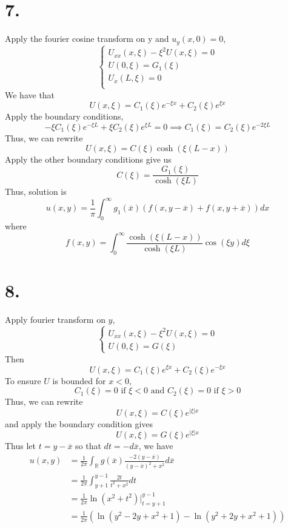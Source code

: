 \documentclass[11pt]{article}
\theoremstyle{mystyle}
\theoremstyle{definition}
\begin{document}
\section*{7.}
Apply the fourier cosine transform on y and $u_y(x,0) = 0$,  
\[
  \begin{cases}
    U_{xx}(x, \xi) - \xi^2 U(x, \xi) = 0 \\
    U(0, \xi) = G_1(\xi) \\
    U_x(L, \xi) = 0 \\
  \end{cases}
\]
We have that 
\[
  U(x, \xi) = C_1(\xi) e^{-\xi x} + C_2(\xi) e^{\xi x}
\]
Apply the boundary conditions, 
\[
    -\xi C_1(\xi) e^{-\xi L} + \xi C_2(\xi) e^{\xi L} = 0 \implies C_1(\xi) =C_2(\xi) e^{-2 \xi L}
\]
Thus, we can rewrite 
\[
  U(x, \xi) = C(\xi) \cosh(\xi (L-x))
\]
Apply the other boundary conditions give us 
\[
  C(\xi) = \displaystyle\frac{G_1(\xi)}{\cosh(\xi L)}
\]
Thus, solution is 
\[
  u(x,y) = \displaystyle\frac{1}{\pi}\int_0^\infty g_1(\overline x) (f(x, y-\overline x) + f(x,y+\overline x)) dx
\]
where 
\[
  f(x,y) = \int_0^\infty \displaystyle\frac{\cosh(\xi(L-x))}{\cosh(\xi L)} \cos(\xi y) d\xi
\]
\newpage
\section*{8.}
Apply fourier transform on $y$, 
\[
  \begin{cases}
    U_{xx}(x, \xi) - \xi^2 U(x,\xi) = 0 \\
    U(0,\xi) = G(\xi)
  \end{cases}
\]
Then 
\[
  U(x, \xi) = C_1(\xi) e^{\xi x} + C_2(\xi) e^{-\xi x}
\]
To ensure $U$ is bounded for $x<0$, 
\[
  C_1(\xi) = 0 \text{ if } \xi < 0 \text{ and } C_2(\xi) = 0 \text{ if } \xi >0
\]
Thus, we can rewrite 
\[
  U(x, \xi) = C(\xi) e^{|\xi|x}
\]
and apply the boundary condition gives 
\[
  U(x,\xi) = G(\xi) e^{|\xi|x}
\]
Thus let $t = y-\overline x$ so that $dt = -d\overline x$, we have 
\begin{align*}
  u(x,y) &= \displaystyle\frac{1}{2\pi} \int_\mathbb{R} g(\overline x)  \displaystyle\frac{-2(y-\overline x)}{(y-\overline x)^2+x^2} d\overline x \\
  &= \displaystyle\frac{1}{2\pi} \int_{y+1}^{y-1} \displaystyle\frac{2t}{t^2 + x^2} dt \\
  &= \displaystyle\frac{1}{2\pi} \ln(x^2 + t^2)|_{t=y+1}^{y-1} \\
  &= \displaystyle\frac{1}{2\pi} \left(\ln\left(y^2-2y+x^2+1\right)-\ln\left(y^2+2y+x^2+1\right) \right)
\end{align*}
\newpage
\end{document}
